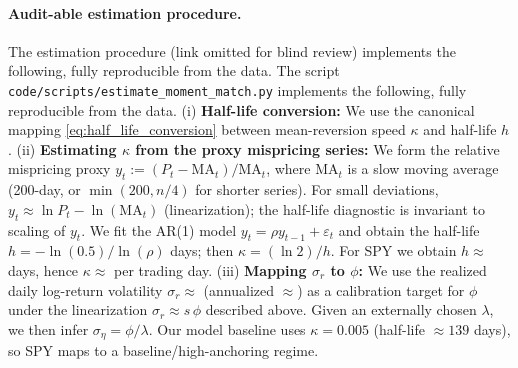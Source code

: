 \paragraph{Audit-able estimation procedure.}
\ifjeicblind The estimation procedure (link omitted for blind review) implements the following, fully reproducible from the data. \else The script \texttt{code/scripts/estimate\_moment\_match.py} implements the following, fully reproducible from the data. \fi
(i) \textbf{Half-life conversion:} We use the canonical mapping \eqref{eq:half_life_conversion} between mean-reversion speed $\kappa$ and half-life $h$.
(ii) \textbf{Estimating $\kappa$ from the proxy mispricing series:} We form the relative mispricing proxy
$y_t := (P_t-\mathrm{MA}_t)/\mathrm{MA}_t$, where $\mathrm{MA}_t$ is a slow moving average (200-day, or $\min(200, n/4)$ for shorter series).
For small deviations, $y_t \approx \ln P_t - \ln(\mathrm{MA}_t)$ (linearization); the half-life diagnostic is invariant to scaling of $y_t$.
We fit the AR(1) model $y_t = \rho y_{t-1} + \varepsilon_t$ and obtain the half-life $h = -\ln(0.5)/\ln(\rho)$ days; then $\kappa = (\ln 2)/h$.
For SPY we obtain $h \approx $ days, hence $\kappa \approx $ per trading day.
(iii) \textbf{Mapping $\sigma_r$ to $\phi$:} We use the realized daily log-return volatility $\sigma_r \approx $ (annualized $\approx $) as a calibration target for $\phi$ under the linearization $\sigma_r \approx s\,\phi$ described above. Given an externally chosen $\lambda$, we then infer $\sigma_\eta=\phi/\lambda$.
Our model baseline uses $\kappa=0.005$ (half-life $\approx 139$ days), so SPY maps to a baseline/high-anchoring regime.

